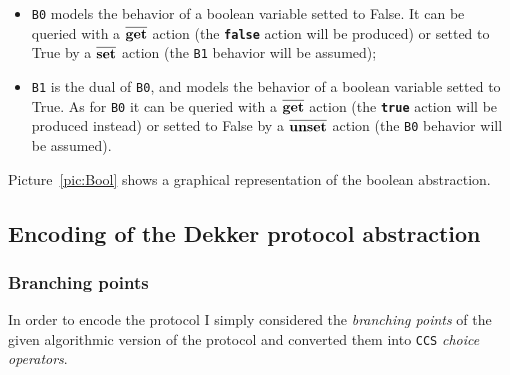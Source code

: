 \documentclass[10pt,a4paper]{article}
\newcommand{\CCS}{{\tt CCS}}
\newcommand{\Agent}[1]{{\tt {#1}}}
\newcommand{\Action}[1]{{\tt \bf {#1}}}
\newcommand{\CoAction}[1]{$\overline{\mbox{\Action{#1}}}$}
\begin{document}
        \begin{itemize}

        \item   \Agent{B0} models the behavior of a boolean variable
                setted to False. It can be queried with a \CoAction{get}
                action (the \Action{false} action will be produced) or
                setted to True by a \CoAction{set} action (the \Agent{B1}
                behavior will be assumed);

        \item   \Agent{B1} is the dual of \Agent{B0}, and models the
                behavior of a boolean variable setted to True. As for
                \Agent{B0} it can be queried with a \CoAction{get} action
                (the \Action{true} action will be produced instead) or
                setted to False by a \CoAction{unset} action (the
                \Agent{B0} behavior will be assumed).

        \end{itemize}

        Picture~\ref{pic:Bool} shows a graphical representation of the
        boolean abstraction.

    \subsection{Encoding of the Dekker protocol abstraction}

        \subsubsection{Branching points}
        \label{subsub:BranchingPoints}

            In order to encode the protocol I simply considered the
            \emph{branching points} of the given algorithmic version of
            the protocol and converted them into \CCS{} \emph{choice
            operators}.
\end{document}
